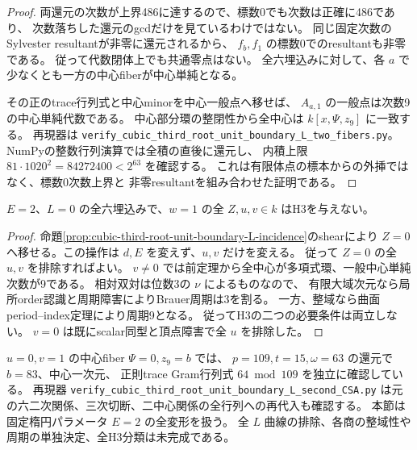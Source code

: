 \begin{proof}
両還元の次数が上界486に達するので、標数0でも次数は正確に486であり、
次数落ちした還元のgcdだけを見ているわけではない。
同じ固定次数のSylvester resultantが非零に還元されるから、
$f_b,f_1$ の標数0でのresultantも非零である。
従って代数閉体上でも共通零点はない。
全六埋込みに対して、各 $a$ で少なくとも一方の中心fiberが中心単純となる。

その正のtrace行列式と中心minorを中心一般点へ移せば、
$A_{a,1}$ の一般点は次数9の中心単純代数である。
中心部分環の整閉性から全中心は $k[x,\Psi,z_9]$ に一致する。
再現器は \texttt{verify\_cubic\_third\_root\_unit\_boundary\_L\_two\_fibers.py}。
NumPyの整数行列演算では全積の直後に還元し、
内積上限 $81\cdot1020^2=84272400<2^{63}$ を確認する。
これは有限体点の標本からの外挿ではなく、標数0次数上界と
非零resultantを組み合わせた証明である。
\end{proof}

\begin{theorem}[$E=2$ の正常一次境界の全H3排除]
\label{thm:cubic-third-root-unit-boundary-L-E2-no-H3}
$E=2$、$L=0$ の全六埋込みで、$w=1$ の全 $Z,u,v\in k$ はH3を与えない。
\end{theorem}
\begin{proof}
命題\ref{prop:cubic-third-root-unit-boundary-L-incidence}のshearにより
$Z=0$ へ移せる。この操作は $d,E$ を変えず、$u,v$ だけを変える。
従って $Z=0$ の全 $u,v$ を排除すればよい。
$v\ne0$ では前定理から全中心が多項式環、一般中心単純次数が9である。
相対双対は位数3の $\nu$ によるものなので、
有限大域次元なら局所order認識と周期障害によりBrauer周期は3を割る。
一方、整域なら曲面period--index定理により周期9となる。
従ってH3の二つの必要条件は両立しない。
$v=0$ は既にscalar同型と頂点障害で全 $u$ を排除した。
\end{proof}

\begin{remark}[独立な第二点と適用範囲]
$u=0,v=1$ の中心fiber $\Psi=0,z_9=b$ では、
$p=109,t=15,\omega=63$ の還元で $b=83$、中心一次元、
正則trace Gram行列式 $64\bmod109$ を独立に確認している。
再現器 \texttt{verify\_cubic\_third\_root\_unit\_boundary\_L\_second\_CSA.py}
は元の六二次関係、三次切断、二中心関係の全行列への再代入も確認する。
本節は固定楕円パラメータ $E=2$ の全変形を扱う。
全 $L$ 曲線の排除、各商の整域性や周期の単独決定、全H3分類は未完成である。
\end{remark}
